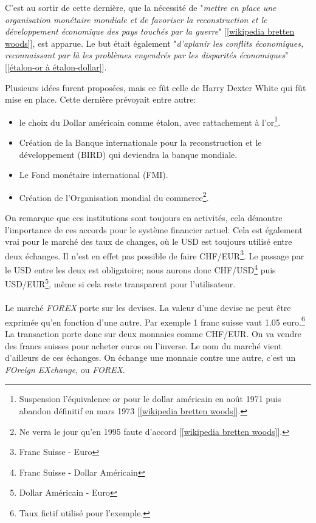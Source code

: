 \documentclass[a4paper, 11pt]{article}
\begin{document}
C'est au sortir de cette dernière, que la nécessité de "\textit{mettre en place une organisation monétaire mondiale et de favoriser la reconstruction et le développement économique des pays touchés par la guerre}" [\ref{wikipedia bretten woods}], est apparue. Le but était également "\textit{d’aplanir les conflits économiques, reconnaissant par là les problèmes engendrés par les disparités économiques}" [\ref{étalon-or à étalon-dollar}].

Plusieurs idées furent proposées, mais ce fût celle de Harry Dexter White qui fût mise en place. Cette dernière prévoyait entre autre:
\begin{itemize}
\item le choix du Dollar américain comme étalon, avec rattachement à l'or\footnote{Suspension l'équivalence or pour le dollar américain en août 1971 puis abandon définitif en mars 1973 [\ref{wikipedia bretten woods}].}.
\item Création de la Banque internationale pour la reconstruction et le développement (BIRD) qui deviendra la banque mondiale.
\item Le Fond monétaire international (FMI).
\item Création de l'Organisation mondial du commerce\footnote{Ne verra le jour qu'en 1995 faute d'accord [\ref{wikipedia bretten woods}].}.
\end{itemize}

On remarque que ces institutions sont toujours en activités, cela démontre l'importance de ces accords pour le système financier actuel. Cela est également vrai pour le marché des taux de changes, où le USD est toujours utilisé entre deux échanges.
Il n'est en effet pas possible de faire CHF/EUR\footnote{Franc Suisse - Euro}. Le passage par le USD entre les deux est obligatoire; nous aurons donc CHF/USD\footnote{Franc Suisse - Dollar Américain} puis USD/EUR\footnote{Dollar Américain - Euro}, même si cela reste transparent pour l'utilisateur.

\paragraph{}
Le marché \textit{FOREX} porte sur les devises. La valeur d'une devise ne peut être exprimée qu'en fonction d'une autre. Par exemple 1 franc suisse vaut 1.05 euro.\footnote{Taux fictif utilisé pour l'exemple.}
La transaction porte donc sur deux monnaies comme CHF/EUR. On va vendre des francs suisses pour acheter euros ou l'inverse.
Le nom du marché vient d'ailleurs de ces échanges. On échange une monnaie contre une autre, c'est un \textit{FOreign EXchange}, ou \textit{FOREX}.
\end{document}
